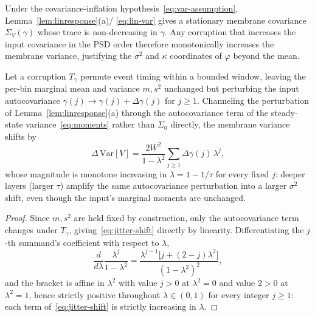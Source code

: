 ﻿\documentclass{article} %
\theoremstyle{remark}
\begin{document}
\begin{corollary}
\label{thm:var}
Under the covariance-inflation hypothesis~\eqref{eq:var-assumption}, Lemma~\ref{lem:linresponse}(a)/
\eqref{eq:lin-var} gives a stationary membrane covariance $\Sigma_V(\gamma)$ whose trace is
non-decreasing in $\gamma$. Any corruption that increases the input covariance in the PSD order
therefore monotonically increases the membrane variance, justifying the $\sigma^2$ and $\kappa$
coordinates of $\varphi$ beyond the mean.
\end{corollary}

\begin{corollary}
\label{thm:jitter}
Let a corruption $T_\gamma$ permute event timing within a bounded window, leaving the per-bin
marginal mean and variance $m,s^2$ unchanged but perturbing the input autocovariance
$\gamma(j)\to\gamma(j)+\Delta\gamma(j)$ for $j\ge1$. Channeling the perturbation of
Lemma~\ref{lem:linresponse}(a) through the autocovariance term of the steady-state
variance~\eqref{eq:moments} rather than $\Sigma_0$ directly, the membrane variance shifts by
\begin{equation}
  \Delta\,\mathrm{Var}[V] = \frac{2W^2}{1-\lambda^2}\sum_{j\ge1}\Delta\gamma(j)\,\lambda^{j},
  \label{eq:jitter-shift}
\end{equation}
whose magnitude is monotone increasing in $\lambda=1-1/\tau$ for every fixed $j$: deeper layers
(larger $\tau$) amplify the same autocovariance perturbation into a larger $\sigma^2$ shift, even
though the input's marginal moments are unchanged.
\end{corollary}
\begin{proof}
Since $m,s^2$ are held fixed by construction, only the autocovariance term changes under $T_\gamma$,
giving~\eqref{eq:jitter-shift} directly by linearity. Differentiating the $j$-th summand's
coefficient with respect to $\lambda$,
\begin{equation*}
  \frac{d}{d\lambda}\frac{\lambda^{j}}{1-\lambda^2}
  = \frac{\lambda^{j-1}\bigl[j+(2-j)\lambda^2\bigr]}{(1-\lambda^2)^2},
\end{equation*}
and the bracket is affine in $\lambda^2$ with value $j>0$ at $\lambda^2=0$ and value $2>0$ at
$\lambda^2=1$, hence strictly positive throughout $\lambda\in(0,1)$ for every integer $j\ge1$: each
term of~\eqref{eq:jitter-shift} is strictly increasing in $\lambda$.
\end{proof}
\end{document}
